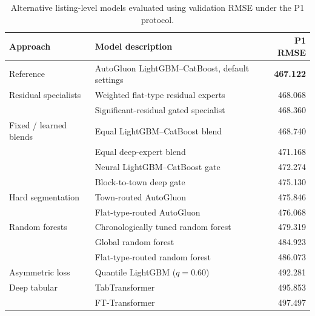 \documentclass[conference]{IEEEtran}
\newif\ifshowsrc
\newcommand{\src}[1]{\ifshowsrc\textsuperscript{\tiny\color{gray}[#1]}\fi}
\begin{document}
\begin{table}[t]
\caption{Alternative listing-level models evaluated using validation RMSE under the P1 protocol.\src{Me-res,Me-seg,Me-alt}}\label{tab:alternatives}
\centering\scriptsize
\begin{tabular}{@{}p{1.45cm}p{5.05cm}r@{}}
\toprule
Approach & Model description & P1 RMSE\\
\midrule
Reference & AutoGluon LightGBM--CatBoost, default settings & \textbf{467.122}\\
Residual specialists & Weighted flat-type residual experts & 468.068\\
 & Significant-residual gated specialist & 468.360\\
Fixed / learned blends & Equal LightGBM--CatBoost blend & 468.740\\
 & Equal deep-expert blend & 471.168\\
 & Neural LightGBM--CatBoost gate & 472.274\\
 & Block-to-town deep gate & 475.130\\
Hard segmentation & Town-routed AutoGluon & 475.846\\
 & Flat-type-routed AutoGluon & 476.068\\
Random forests & Chronologically tuned random forest & 479.319\\
 & Global random forest & 484.923\\
 & Flat-type-routed random forest & 486.073\\
Asymmetric loss & Quantile LightGBM ($q{=}0.60$) & 492.281\\
Deep tabular & TabTransformer & 495.853\\
 & FT-Transformer & 497.497\\
\bottomrule
\end{tabular}
\end{table}
\end{document}
